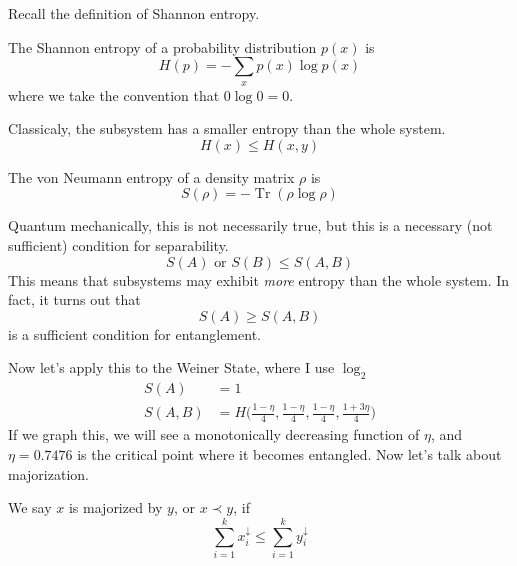 \documentclass{article}
\DeclareMathOperator{\Tr}{Tr}
\begin{document}
  Recall the definition of Shannon entropy. 

  \begin{definition}
    The Shannon entropy of a probability distribution $p(x)$ is 
    \begin{equation}
      H(p) = - \sum_x p(x) \log p(x)
    \end{equation}
    where we take the convention that $0 \log 0 = 0$.
  \end{definition}

  \begin{theorem}
    Classicaly, the subsystem has a smaller entropy than the whole system. 
    \begin{equation}
      H(x) \leq H(x, y)
    \end{equation}
  \end{theorem}

  \begin{definition}
    The von Neumann entropy of a density matrix $\rho$ is 
    \begin{equation}
      S(\rho) = - \Tr(\rho \log \rho)
    \end{equation}
  \end{definition}

  Quantum mechanically, this is not necessarily true, but this is a necessary (not sufficient) condition for separability. 
  \begin{equation}
    S(A) \text{ or } S(B) \leq S(A, B)
  \end{equation}
  This means that subsystems may exhibit \textit{more} entropy than the whole system. In fact, it turns out that 
  \begin{equation}
    S(A) \geq S(A, B)
  \end{equation} 
  is a sufficient condition for entanglement.

  Now let's apply this to the Weiner State, where I use $\log_2$
  \begin{align}
    S(A) & = 1  \\
    S(A, B) & = H \bigg( \frac{1 - \eta}{4} , \frac{1 - \eta}{4}, \frac{1 - \eta}{4}, \frac{1 + 3\eta}{4} \bigg)
  \end{align} 
  If we graph this, we will see a monotonically decreasing function of $\eta$, and $\eta = 0.7476$ is the critical point where it becomes entangled. Now let's talk about majorization. 

  \begin{definition}[Majorization]
    We say $x$ is majorized by $y$, or $x \prec y$, if 
    \begin{equation}
      \sum_{i=1}^k x_i^{\downarrow} \leq \sum_{i=1}^k y_i^{\downarrow}
    \end{equation}
  \end{definition}
\end{document}

